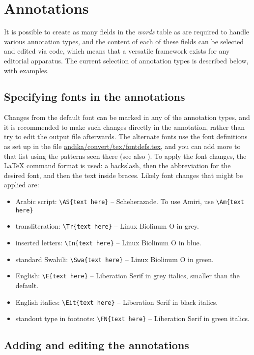 \section{Annotations}
\label{s:annotation}

It is possible to create as many fields in the \textit{words} table as are required to handle various annotation types, and the content of each of these fields can be selected and edited via code, which means that a versatile framework exists for any editorial apparatus.  The current selection of annotation types is described below, with examples.

\subsection{Specifying fonts in the annotations}

Changes from the default font can be marked in any of the annotation types, and it is recommended to make such changes directly in the annotation, rather than try to edit the output file afterwards.  The alternate fonts use the font definitions as set up in the file \url{andika/convert/tex/fontdefs.tex}, and you can add more to that list using the patterns seen there (see also ).  To apply the font changes, the LaTeX command format is used: a backslash, then the abbreviation for the desired font, and then the text inside braces.  Likely font changes that might be applied are:
\begin{itemize}
\item Arabic script: \verb|\AS{text here}| -- Scheherazade.  To use Amiri, use \verb|\Am{text here}|
\item transliteration: \verb|\Tr{text here}| -- Linux Biolinum O in grey.
\item inserted letters: \verb|\In{text here}| -- Linux Biolinum O in blue.
\item standard Swahili: \verb|\Swa{text here}| -- Linux Biolinum O in green.
\item English: \verb|\E{text here}| -- Liberation Serif in grey italics, smaller than the default.
\item English italics: \verb|\Eit{text here}| -- Liberation Serif in black italics.	
\item standout type in footnote: \verb|\FN{text here}| -- Liberation Serif in green italics. 
\end{itemize}

\subsection{Adding and editing the annotations}

